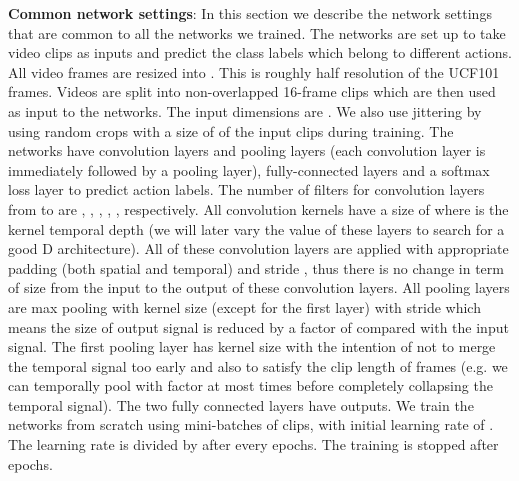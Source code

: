 \documentclass[10pt,twocolumn,letterpaper]{article}
\begin{document}
{\bf Common network settings}: In this section we describe the network settings that are common to all the networks we trained. The networks are set up to take video clips as inputs and predict the class labels which belong to  different actions. All video frames are resized into . This is roughly half resolution of the UCF101 frames. Videos are split into non-overlapped 16-frame clips which are then used as input to the networks. The input dimensions are . We also use jittering by using random crops with a size of  of the input clips during training. The networks have  convolution layers and  pooling layers (each convolution layer is immediately followed by a pooling layer),  fully-connected layers and a softmax loss layer to predict action labels. The number of filters for  convolution layers from  to  are , , , , , respectively. All convolution kernels have a size of  where  is the kernel temporal depth (we will later vary the value  of these layers to search for a good D architecture). All of these convolution layers are applied with appropriate padding (both spatial and temporal) and stride , thus there is no change in term of size from the input to the output of these convolution layers. All pooling layers are max pooling with kernel size  (except for the first layer) with stride  which means the size of output signal is reduced by a factor of  compared with the input signal. The first pooling layer has kernel size  with the intention of not to merge the temporal signal too early and also to satisfy the clip length of  frames (e.g. we can temporally pool with factor  at most  times before completely collapsing the temporal signal). The two fully connected layers have  outputs. We train the networks from scratch using mini-batches of  clips, with initial learning rate of . The learning rate is divided by  after every  epochs. The training is stopped after  epochs.
\end{document}
